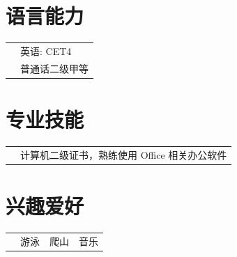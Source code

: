 \documentclass[a4paper,11pt]{article}
\begin{document}
\section{语言能力}
\begin{tabular}{rl}
&英语: CET4\\
&普通话二级甲等\\
\end{tabular}

\section{专业技能}
\begin{tabular}{rl}
&计算机二级证书，熟练使用 Office 相关办公软件\\
\end{tabular}

\section{兴趣爱好}
\begin{tabular}{rl}
&游泳~~爬山~~音乐
\end{tabular}
\end{document}
